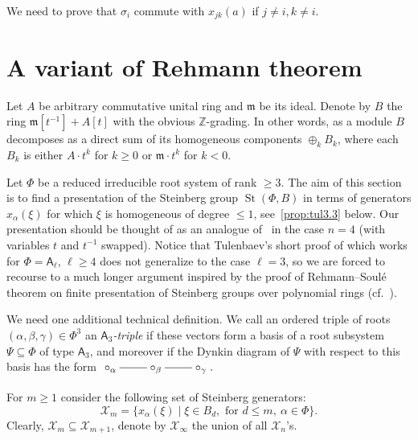 \documentclass[oneside, 10pt]{amsart}
\DeclareMathOperator{\St}{St}
\newcommand{\rA}{\mathsf{A}}
\newcommand{\XX}[1]{\mathcal{X}_{#1}}
\numberwithin{equation}{section}
\numberwithin{lemma}{section}
\theoremstyle{definition}
\theoremstyle{remark}
\begin{document}
We need to prove that $\sigma_i$ commute with $x_{jk}(a)$ if $j\neq i, k \neq i$.

\section{A variant of Rehmann theorem}
Let $A$ be arbitrary commutative unital ring and $\mathfrak{m}$ be its ideal.
Denote by $B$ the ring $\mathfrak{m}[t^{-1}] + A[t]$ with the obvious $\mathbb{Z}$-grading.
In other words, as a module $B$ decomposes as a direct sum of its homogeneous components $\oplus_k B_k$,
 where each $B_k$ is either $A\cdot t^k$ for $k \geq 0$ or $\mathfrak{m} \cdot t^k$ for $k<0$.

Let $\Phi$ be a reduced irreducible root system of rank $\geq 3$.
The aim of this section is to find a presentation of the Steinberg group $\St(\Phi, B)$ in terms of generators $x_{\alpha}(\xi)$
 for which $\xi$ is homogeneous of degree $\leq 1$, see~\cref{prop:tul3.3} below.
Our presentation should be thought of as an analogue of~\cite[Lemma~3.3]{Tu83} in the case $n=4$ (with variables $t$ and $t^{-1}$ swapped).
Notice that Tulenbaev's short proof of \cite[Lemma~3.3]{Tu83} which works for $\Phi=\rA_\ell$, $\ell\geq 4$ does not generalize to the case $\ell=3$,
 so we are forced to recourse to a much longer argument inspired by the proof of Rehmann--Soul{\'e} theorem on
 finite presentation of Steinberg groups over polynomial rings (cf.~\cite{Re75, RS76}).

We need one additional technical definition. We call an ordered triple of roots $(\alpha, \beta, \gamma) \in \Phi^3$ an {\it $\rA_3$-triple}
 if these vectors form a basis of a root subsystem $\Psi \subseteq \Phi$ of type $\rA_3$, and moreover if the Dynkin diagram of $\Psi$ with respect to this basis has the form
 $\xymatrix{\circ_\alpha \ar@{-}[r] & \circ_\beta \ar@{-}[r] & \circ_\gamma}.$ %
 
For $m \geq 1$ consider the following set of Steinberg generators:
\[\XX{m} = \{ x_{\alpha}(\xi) \mid \xi \in B_d,\text{ for } d\leq m,\ \alpha\in\Phi\}. \]
Clearly, $\XX{m} \subseteq \XX{m+1}$, denote by $\XX{\infty}$ the union of all $\XX{n}$'s.
 
\end{document}
